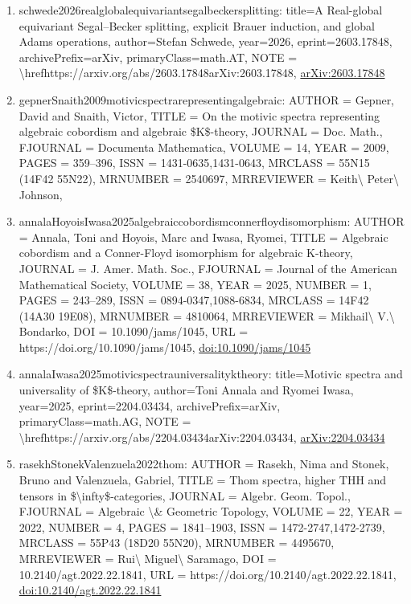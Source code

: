 \documentclass[11pt]{article}
\begin{document}
\begin{enumerate}[leftmargin=*]
  \item schwede2026realglobalequivariantsegalbeckersplitting: title=A Real-global equivariant Segal--Becker splitting, explicit Brauer induction, and global Adams operations, author=Stefan Schwede, year=2026, eprint=2603.17848, archivePrefix=arXiv, primaryClass=math.AT, NOTE = \textbackslash{}hrefhttps://arxiv.org/abs/2603.17848arXiv:2603.17848, \href{https://arxiv.org/abs/2603.17848}{arXiv:2603.17848}
  \item gepnerSnaith2009motivicspectrarepresentingalgebraic: AUTHOR = Gepner, David and Snaith, Victor, TITLE = On the motivic spectra representing algebraic cobordism and algebraic \$K\$-theory, JOURNAL = Doc. Math., FJOURNAL = Documenta Mathematica, VOLUME = 14, YEAR = 2009, PAGES = 359--396, ISSN = 1431-0635,1431-0643, MRCLASS = 55N15 (14F42 55N22), MRNUMBER = 2540697, MRREVIEWER = Keith\textbackslash{} Peter\textbackslash{} Johnson,
  \item annalaHoyoisIwasa2025algebraiccobordismconnerfloydisomorphism: AUTHOR = Annala, Toni and Hoyois, Marc and Iwasa, Ryomei, TITLE = Algebraic cobordism and a Conner-Floyd isomorphism for algebraic K-theory, JOURNAL = J. Amer. Math. Soc., FJOURNAL = Journal of the American Mathematical Society, VOLUME = 38, YEAR = 2025, NUMBER = 1, PAGES = 243--289, ISSN = 0894-0347,1088-6834, MRCLASS = 14F42 (14A30 19E08), MRNUMBER = 4810064, MRREVIEWER = Mikhail\textbackslash{} V.\textbackslash{} Bondarko, DOI = 10.1090/jams/1045, URL = https://doi.org/10.1090/jams/1045, \href{https://doi.org/10.1090/jams/1045}{doi:10.1090/jams/1045}
  \item annalaIwasa2025motivicspectrauniversalityktheory: title=Motivic spectra and universality of \$K\$-theory, author=Toni Annala and Ryomei Iwasa, year=2025, eprint=2204.03434, archivePrefix=arXiv, primaryClass=math.AG, NOTE = \textbackslash{}hrefhttps://arxiv.org/abs/2204.03434arXiv:2204.03434, \href{https://arxiv.org/abs/2204.03434}{arXiv:2204.03434}
  \item rasekhStonekValenzuela2022thom: AUTHOR = Rasekh, Nima and Stonek, Bruno and Valenzuela, Gabriel, TITLE = Thom spectra, higher THH and tensors in \$\textbackslash{}infty\$-categories, JOURNAL = Algebr. Geom. Topol., FJOURNAL = Algebraic \textbackslash{}\& Geometric Topology, VOLUME = 22, YEAR = 2022, NUMBER = 4, PAGES = 1841--1903, ISSN = 1472-2747,1472-2739, MRCLASS = 55P43 (18D20 55N20), MRNUMBER = 4495670, MRREVIEWER = Rui\textbackslash{} Miguel\textbackslash{} Saramago, DOI = 10.2140/agt.2022.22.1841, URL = https://doi.org/10.2140/agt.2022.22.1841, \href{https://doi.org/10.2140/agt.2022.22.1841}{doi:10.2140/agt.2022.22.1841}

\end{enumerate}
\end{document}
